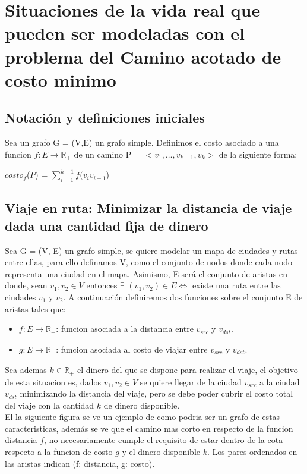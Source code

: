 \section{Situaciones de la vida real que pueden ser modeladas con el problema del Camino acotado de costo minimo}
\subsection{Notaci\'on y definiciones iniciales}
Sea un grafo G = (V,E) un grafo simple. Definimos el costo asociado a una funcion $f:E \rightarrow \mathbb{R}_+$ de un camino P = $<v_{1}, \dots, v_{k-1}, v_{k}>$ de la siguiente forma:
\begin{center}
	$costo_f$($P$) = $\sum_{i=1}^{k-1} f(v_i v_{i+1}$)
\end{center}

\subsection{Viaje en ruta: Minimizar la distancia de viaje dada una cantidad fija de dinero}
Sea G = (V, E) un grafo simple, se quiere modelar un mapa de ciudades y rutas entre ellas, para ello definamos V, como el conjunto de nodos donde cada nodo representa una ciudad en el mapa. Asimismo, E ser\'a el conjunto de aristas en donde, sean $v_1,v_2 \in V $ entonces $\exists $ $(v_1,v_2) \in E \Leftrightarrow$ existe una ruta entre las ciudades $v_{1}$ y $v_{2}$. A continuaci\'on definiremos dos funciones sobre el conjunto E de aristas tales que:
\begin{itemize}
	\item $f:E \rightarrow \mathbb{R}_+$: funcion asociada a la distancia entre $v_{src}$ y $v_{dst}$.
	\item $g:E \rightarrow \mathbb{R}_+$: funcion asociada al costo de viajar entre $v_{src}$ y $v_{dst}$.
\end{itemize}
Sea ademas $k \in \mathbb{R}_+$ el dinero del que se dispone para realizar el viaje, el objetivo de esta situacion es, dados $v_1, v_2 \in V$ se quiere llegar de la ciudad $v_{src}$ a la ciudad $v_{dst}$ minimizando la distancia del viaje, pero se debe poder cubrir el costo total del viaje con la cantidad $k$ de dinero disponible.\\
El la siguiente figura se ve un ejemplo de como podria ser un grafo de estas caracteristicas, adem\'as se ve que el camino mas corto en respecto de la funcion distancia $f$, no necesariamente
cumple el requisito de estar dentro de la cota respecto a la funcion de costo $g$ y el dinero disponible $k$. Los pares ordenados en las aristas indican (f: distancia, g: costo).\\

